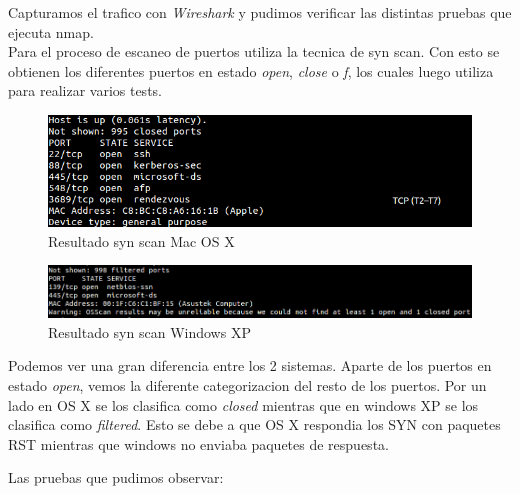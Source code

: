 \documentclass[a4paper]{article}
\begin{document}
Capturamos el trafico con \textit{Wireshark} y pudimos verificar las distintas pruebas que ejecuta nmap.\\

Para el proceso de escaneo de puertos utiliza la tecnica de syn scan. Con esto se obtienen los diferentes puertos en estado \textit{open}, \textit{close} o \textit{f}, los cuales luego utiliza para realizar varios tests.


\begin{figure}[H]
  \centering
  \includegraphics[scale=0.60]{graficos/macPorts.png}
  \caption{Resultado syn scan Mac OS X}
\end{figure}  

\begin{figure}[H]
  \centering
  \includegraphics[scale=0.60]{graficos/windowsPorts.png}
  \caption{Resultado syn scan Windows XP}
\end{figure}

Podemos ver una gran diferencia entre los 2 sistemas. Aparte de los puertos en estado \textit{open}, vemos la diferente categorizacion del resto de los puertos. Por un lado en OS X se los clasifica como \textit{closed} mientras que en windows XP se los clasifica como \textit{filtered}. Esto se debe a que OS X respondia los SYN con paquetes RST mientras que windows no enviaba paquetes de respuesta. 
  

Las pruebas que pudimos observar:
\end{document}
